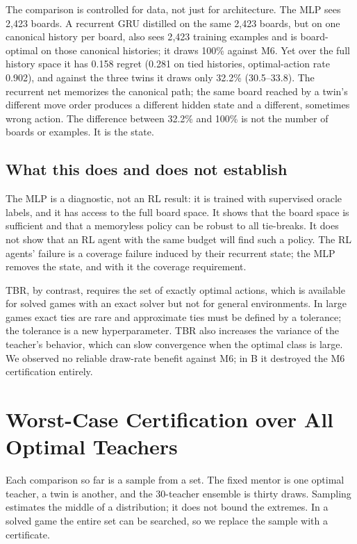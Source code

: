 \documentclass[conference]{IEEEtran}
\begin{document}
The comparison is controlled for data, not just for architecture. The MLP sees 2{,}423 boards. A recurrent GRU distilled on the same 2{,}423 boards, but on one canonical history per board, also sees 2{,}423 training examples and is board-optimal on those canonical histories; it draws 100\% against M6. Yet over the full history space it has 0.158 regret (0.281 on tied histories, optimal-action rate 0.902), and against the three twins it draws only 32.2\% (30.5--33.8). The recurrent net memorizes the canonical path; the same board reached by a twin's different move order produces a different hidden state and a different, sometimes wrong action. The difference between 32.2\% and 100\% is not the number of boards or examples. It is the state.

\subsection{What this does and does not establish}
The MLP is a diagnostic, not an RL result: it is trained with supervised oracle labels, and it has access to the full board space. It shows that the board space is sufficient and that a memoryless policy can be robust to all tie-breaks. It does not show that an RL agent with the same budget will find such a policy. The RL agents' failure is a coverage failure induced by their recurrent state; the MLP removes the state, and with it the coverage requirement.

TBR, by contrast, requires the set of exactly optimal actions, which is available for solved games with an exact solver but not for general environments. In large games exact ties are rare and approximate ties must be defined by a tolerance; the tolerance is a new hyperparameter. TBR also increases the variance of the teacher's behavior, which can slow convergence when the optimal class is large. We observed no reliable draw-rate benefit against M6; in B it destroyed the M6 certification entirely.

\section{Worst-Case Certification over All Optimal Teachers}
\label{sec:worst}

Each comparison so far is a sample from a set. The fixed mentor is one optimal teacher, a twin is another, and the 30-teacher ensemble is thirty draws. Sampling estimates the middle of a distribution; it does not bound the extremes. In a solved game the entire set can be searched, so we replace the sample with a certificate.
\end{document}

